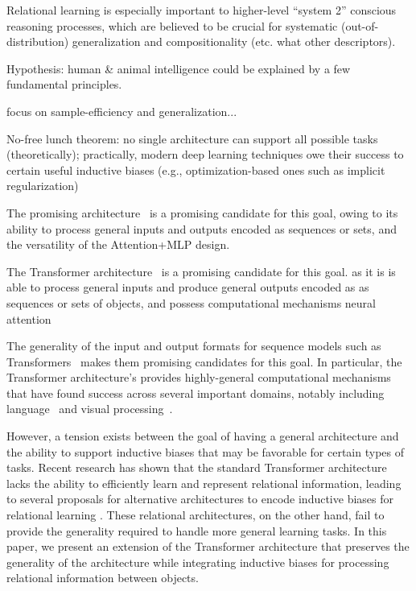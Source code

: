Relational learning is especially important to higher-level ``system 2'' conscious reasoning processes, which are believed to be crucial for systematic (out-of-distribution) generalization and compositionality (etc. what other descriptors).

Hypothesis: human \& animal intelligence could be explained by a few fundamental principles.

focus on sample-efficiency and generalization...

No-free lunch theorem: no single architecture can support all possible tasks (theoretically); practically, modern deep learning techniques owe their success to certain useful inductive biases (e.g., optimization-based ones such as implicit regularization)

The promising architecture~\citep{vaswani2017attention} is a promising candidate for this goal, owing to its ability to process general inputs and outputs encoded as sequences or sets, and the versatility of the Attention+MLP design.


The Transformer architecture~\citep{vaswani2017attention} is a promising candidate for this goal.  as it is is able to process general inputs and produce general outputs encoded as as sequences or sets of objects, and possess computational mechanisms neural attention

The generality of the input and output formats for sequence models such as Transformers~\citep{vaswani2017attention} makes them promising candidates for this goal. In particular, the Transformer architecture's  provides highly-general computational mechanisms that have found success across several important domains, notably including language~\citep{devlinBERTPretrainingDeep2019,radford2019language} and visual processing~\citep{dosovitskiyImageWorth16x162020}.

However, a tension exists between the goal of having a general architecture and the ability to support inductive biases that may be favorable for certain types of tasks. Recent research has shown that the standard Transformer architecture lacks the ability to efficiently learn and represent relational information, leading to several proposals for alternative architectures to encode inductive biases for relational learning \citep{santoroSimpleNeuralNetwork2017,santoroRelationalRecurrentNeural2018,shanahanExplicitlyRelationalNeurala,webbEmergentSymbolsBinding2021,webbRelationalBottleneckInductive2024,kergNeuralArchitectureInductive2022,altabaa2024abstractors,altabaaLearningHierarchicalRelational2024}. These relational architectures, on the other hand, fail to provide the generality required to handle more general learning tasks. In this paper, we present an extension of the Transformer architecture that preserves the generality of the architecture while integrating inductive biases for processing relational information between objects.

